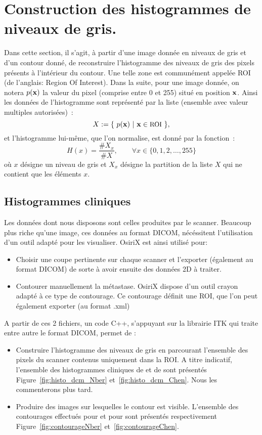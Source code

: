 \documentclass[main.tex]{subfiles}
\begin{document}
\section{Construction des histogrammes de niveaux de gris.}
Dans cette section, il s'agit, à partir d'une image donnée en niveaux de gris et d'un contour donné, de reconstruire l'histogramme des niveaux de gris des pixels présents à l'intérieur du contour. Une telle zone est communément appelée ROI (de l'anglais: Region Of Interest). Dans la suite, pour une image donnée, on notera $p(\mathbf{x})$ la valeur du pixel (comprise entre 0 et 255) situé en position $\mathbf{x}$. Ainsi les données de l'histogramme sont représenté par la liste (ensemble avec valeur multiples autorisées)~:
\begin{equation}
\label{eq:def_data_histo}
X:=\{ \ p(\mathbf{x}) \  | \  \mathbf{x} \in \textrm{\small ROI} \ \},
\end{equation}
et l'histogramme lui-même, que l'on normalise, est donné par la fonction~:
\begin{equation}
\label{eq:def_histo}
H(x) = \dfrac{ \# X_x  }{ \# X }, \qquad \forall x \in \{ 0,1,2,\ldots,255 \}
\end{equation}
où $x$ désigne un niveau de gris et $X_x$ désigne la partition de la liste $X$ qui ne contient que les éléments $x$.

\subsection{Histogrammes cliniques}
Les données dont nous disposons sont celles produites par le scanner. Beaucoup plus riche qu'une image, ces données au format DICOM, nécéssitent l'utilisation d'un outil adapté pour les visualiser. OsiriX est ainsi utilisé pour:
\begin{itemize}
\item Choisir une coupe pertinente sur chaque scanner et l'exporter (également au format DICOM) de sorte à avoir ensuite des données 2D à traiter.
\item Contourer manuellement la métastase. OsiriX dispose d'un outil crayon adapté à ce type de contourage. Ce contourage définit une ROI, que l'on peut également exporter (au format .xml)
\end{itemize}
A partir de ces 2 fichiers, un code C++, s'appuyant sur la librairie ITK qui traite entre autre le format DICOM, permet de :
\begin{itemize}
\item Construire l'histogramme des niveaux de gris en parcourant  l'ensemble des pixels du scanner contenus uniquement dans la ROI. 
A titre indicatif, l'ensemble des histogrammes cliniques de \Nber et de \Chen sont présentés Figure~\ref{fig:histo_dcm_Nber} et~\ref{fig:histo_dcm_Chen}. Nous les commenterons plus tard.
\item Produire des images sur lesquelles le contour est visible. L'ensemble des contourages effectués pour \Nber et pour \Chen sont présentés respectivement Figure~\ref{fig:contourageNber} et~\ref{fig:contourageChen}.
\end{itemize}
\end{document}
